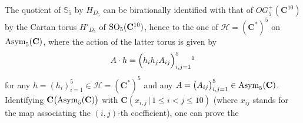 \documentclass[11pt]{amsart}
\begin{document}
The quotient of $\mathbb S_5$ by $H_{D_5}$ can be birationally identified with that of $OG_5^+(\mathbf C^{10})$ by the Cartan torus $H'_{D_5}$ of ${\rm SO}_5(\mathbf C^{10})$, hence to the one of $\mathcal H=(\mathbf C^*)^5$ on ${\rm Asym}_5(\mathbf C)$, where the action of the latter torus is given by 
$$
A\cdot h = \Big(h_ih_j A_{ij}\Big)_{i,j=1}^5
\footnotemark
$$
for any $h=(h_i)_{i=1}^5\in \mathcal H=(\mathbf C^*)^5$ and any $A=\big(A_{ij}\big)_{i,j=1}^5\in 
{\rm Asym}_5(\mathbf C)$.  Identifying $\mathbf C\big( 
{\rm Asym}_5(\mathbf C) \big) $ with $\mathbf C( x_{i,j}\,\lvert \,1\leq i<j\leq 10)$ (where $x_{ij}$ stands for the map associating the $(i,j)$-th coefficient), one can prove the
\end{document}
